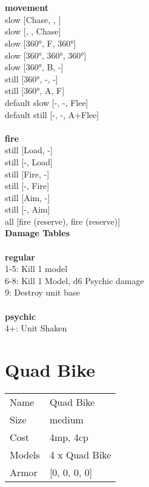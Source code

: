  
\ \\



\ \\ {\bf movement } \\
slow [Chase, , ] \\
slow [, , Chase] \\
slow [360°, F, 360°] \\
slow [360°, 360°, 360°] \\
slow [360°, B, -] \\
still [360°, -, -] \\
still [360°, A, F] \\
default slow [-, -, Flee] \\
default still [-, -, A+Flee] \\
\ \\ {\bf fire } \\
still [Load, -] \\
still [-, Load] \\
still [Fire, -] \\
still [-, Fire] \\
still [Aim, -] \\
still [-, Aim] \\
all [fire (reserve), fire (reserve)] \\


{\bf Damage Tables} \\
\ \\ {\bf regular } \\
1-5: Kill 1 model \\
6-8: Kill 1 Model, d6 Psychic damage \\
9: Destroy unit base \\
\ \\ {\bf psychic } \\
4+: Unit Shaken \\










\pagebreak\pagebreak

\section{ Quad Bike }

\begin{tabular}{ll}
  Name & Quad Bike \\
  Size & medium\\
  Cost & 4mp, 4cp\\
  Models & 4 x Quad Bike\\
  Armor & [0, 0, 0, 0]\\
\end{tabular}

